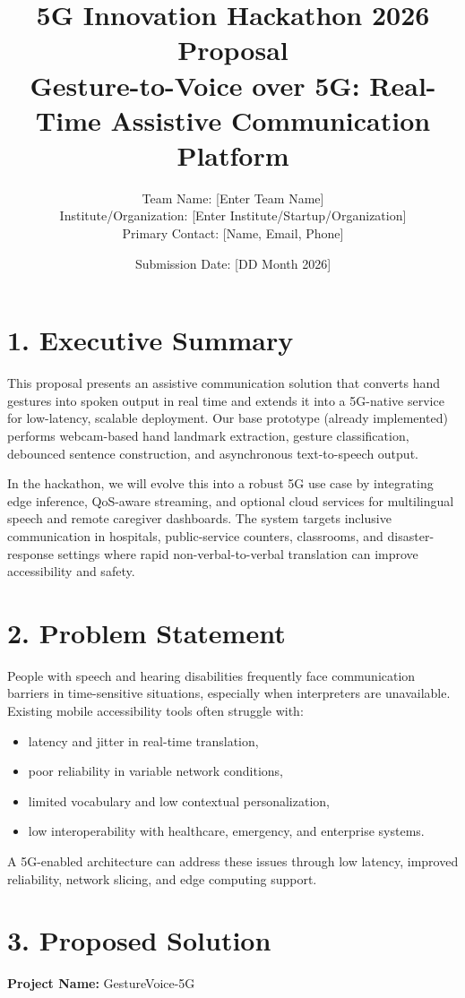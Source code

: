 \documentclass[11pt,a4paper]{article}
\title{\textbf{5G Innovation Hackathon 2026 Proposal}\\
\large Gesture-to-Voice over 5G: Real-Time Assistive Communication Platform}
\author{Team Name: [Enter Team Name] \\
Institute/Organization: [Enter Institute/Startup/Organization] \\
Primary Contact: [Name, Email, Phone]}
\date{Submission Date: [DD Month 2026]}
\begin{document}
\maketitle

\section*{1. Executive Summary}
This proposal presents an assistive communication solution that converts hand gestures into spoken output in real time and extends it into a 5G-native service for low-latency, scalable deployment. Our base prototype (already implemented) performs webcam-based hand landmark extraction, gesture classification, debounced sentence construction, and asynchronous text-to-speech output. 

In the hackathon, we will evolve this into a robust 5G use case by integrating edge inference, QoS-aware streaming, and optional cloud services for multilingual speech and remote caregiver dashboards. The system targets inclusive communication in hospitals, public-service counters, classrooms, and disaster-response settings where rapid non-verbal-to-verbal translation can improve accessibility and safety.

\section*{2. Problem Statement}
People with speech and hearing disabilities frequently face communication barriers in time-sensitive situations, especially when interpreters are unavailable. Existing mobile accessibility tools often struggle with:
\begin{itemize}
    \item latency and jitter in real-time translation,
    \item poor reliability in variable network conditions,
    \item limited vocabulary and low contextual personalization,
    \item low interoperability with healthcare, emergency, and enterprise systems.
\end{itemize}

A 5G-enabled architecture can address these issues through low latency, improved reliability, network slicing, and edge computing support.

\section*{3. Proposed Solution}
\textbf{Project Name:} GestureVoice-5G
\end{document}

